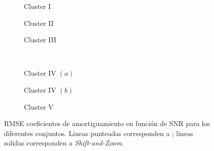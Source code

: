 			\newpage
			\begin{figure}[h!]
				\begin{subfigure}[h]{0.5\textwidth}
					\centering
					\resizebox{\linewidth}{!}{}
					\caption{Cluster I}
					\label{SubFig:Cluster_I_real}
				\end{subfigure}
				\begin{subfigure}[h]{0.5\textwidth}
					\centering
					\resizebox{\linewidth}{!}{}
					\caption{Cluster II}
					\label{SubFig:Cluster_II_real}
				\end{subfigure}
				\begin{subfigure}[h]{0.5\textwidth}
					\centering
					\resizebox{\linewidth}{!}{}
					\caption{Cluster III}
					\label{SubFig:Cluster_III_real}
				\end{subfigure}
				~
				\begin{subfigure}[h]{0.5\textwidth}
					\centering
					\resizebox{\linewidth}{!}{}
					\caption{Cluster IV $(a)$}
					\label{SubFig:Cluster_IV_real}
				\end{subfigure}
				\begin{subfigure}[h]{0.5\textwidth}
					\centering
					\resizebox{\linewidth}{!}{}
					\caption{Cluster IV $(b)$}
					\label{SubFig:Cluster_V_real}
				\end{subfigure}
				\begin{subfigure}[h]{0.5\textwidth}
					\centering
					\resizebox{\linewidth}{!}{}
					\caption{Cluster V}
				    \label{SubFig:Cluster_VI_real}
				\end{subfigure}
				\caption{RMSE coeficientes de amortiguamiento en función de SNR para los diferentes conjuntos. Lineas punteadas corresponden a \cite{Andersson2014}; lineas solidas corresponden a \emph{Shift-and-Zoom}.}
				\label{Fig:RMSE_Cluster_gamma}
			\end{figure}


